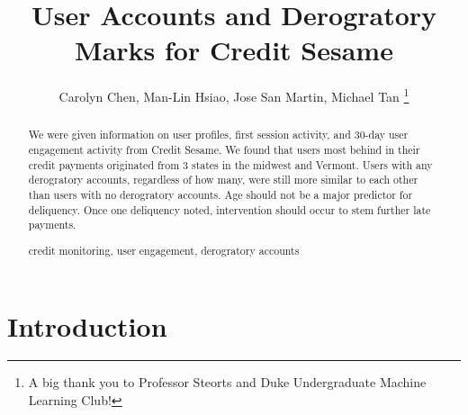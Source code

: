\documentclass[11pt]{llncs}
\newcommand{\keywords}[1]{\par\addvspace\baselineskip
\noindent\keywordname\enspace\ignorespaces#1}
\begin{document}


\mainmatter  %
\title{User Accounts and Derogratory Marks for Credit Sesame}


\author{Carolyn Chen, Man-Lin Hsiao, Jose San Martin, Michael Tan
  \thanks{A big thank you to Professor Steorts and Duke Undergraduate Machine Learning Club!}
 }



\maketitle


\begin{abstract}
We were given information on user profiles, first session activity, and 30-day user engagement activity from Credit Sesame. We found that users most behind in their credit payments originated from 3 states in the midwest and Vermont. Users with any derogratory accounts, regardless of how many, were still more similar to each other than users with no derogratory accounts. Age should not be a major predictor for deliquency. Once one deliquency noted, intervention should occur to stem further late payments.

\keywords{credit monitoring, user engagement, derogratory accounts}
\end{abstract}




\section{Introduction}
\label{sec:introduction}
\end{document}
